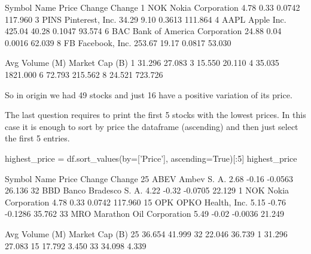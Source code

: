 \begin{solution}
\begin{ioutput}
  Symbol                         Name   Price  Change  Change%
1    NOK            Nokia Corporation    4.78    0.33   0.0742     117.960
3   PINS              Pinterest, Inc.   34.29    9.10   0.3613     111.864
4   AAPL                   Apple Inc.  425.04   40.28   0.1047      93.574
6    BAC  Bank of America Corporation   24.88    0.04   0.0016      62.039
8     FB               Facebook, Inc.  253.67   19.17   0.0817      53.030

   Avg Volume (M)  Market Cap (B)
1          31.296          27.083
3          15.550          20.110
4          35.035        1821.000
6          72.793         215.562
8          24.521         723.726
\end{ioutput}
        
So in origin we had 49 stocks and just 16 have a positive variation of its price.

The last question requires to print the first 5 stocks with the lowest prices. In this case it is enough to sort by price the dataframe (ascending) and then just select the first 5 entries.

\begin{ipython}
highest_price = df.sort_values(by=['Price'], ascending=True)[:5]
highest_price
\end{ipython}
\begin{ioutput}
   Symbol                      Name  Price  Change  Change%
25   ABEV               Ambev S. A.   2.68   -0.16  -0.0563      26.136
32    BBD      Banco Bradesco S. A.   4.22   -0.32  -0.0705      22.129
1     NOK         Nokia Corporation   4.78    0.33   0.0742     117.960
15    OPK         OPKO Health, Inc.   5.15   -0.76  -0.1286      35.762
33    MRO  Marathon Oil Corporation   5.49   -0.02  -0.0036      21.249

    Avg Volume (M)  Market Cap (B)
25          36.654          41.999
32          22.046          36.739
1           31.296          27.083
15          17.792           3.450
33          34.098           4.339
\end{ioutput}
\end{solution}

